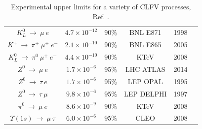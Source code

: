 \begin{center}
\begin{table}[!h]
\begin{tabular}{c c c c c c}
$K_L^0 \ \rightarrow \ \mu \ e$ & $4.7 \times 10^{-12}$& 90\% & BNL E871 & 1998 & \cite{BNL:1998apv}\\
$K^+\ \rightarrow \ \pi^+ \ \mu^+ \ e^-$ & $2.1 \times 10^{-10} $ & 90\% & BNL E865 & 2005 & \cite{PhysRevD.72.012005}\\
$K_L^0 \ \rightarrow \ \pi^0 \ \mu^+ \ e^-$ & $ 4.4 \times 10^{-10}$ & 90\% & KTeV & 2008 & \cite{KTeV:2007cvy}\\
$Z^0 \ \rightarrow \ \mu \ e$ & $1.7 \times 10^{-6}$ & 95\% &  LHC ATLAS & 2014 & \cite{Aad_2014} \\
$Z^0 \ \rightarrow \ \tau \ e$ & $1.7 \times 10^{-6}$ & 95\% &  LEP OPAL & 1995 & \cite{akers}\\
$Z^0 \ \rightarrow \ \tau \ \mu$ & $9.8 \times 10^{-6}$ & 95\% &  LEP DELPHI & 1997 & \cite{abreu}\\
$\pi^0 \ \rightarrow \ \mu \ e$ & $8.6 \times 10^{-9}$ & 90\% & KTeV & 2008 & \cite{KTeV:2007cvy}\\
$\Upsilon (1s) \ \rightarrow \ \mu \ \tau $ & $6.0 \times 10^{-6}$ & 95\% & CLEO & 2008 & \cite{Love_2008}\\
\hline
\end{tabular}
\caption{Experimental upper limits for a variety of CLFV processes, Ref. \cite{clfv_signorelli}.}
\end{table}\label{tab:upperlimits}
\end{center}


